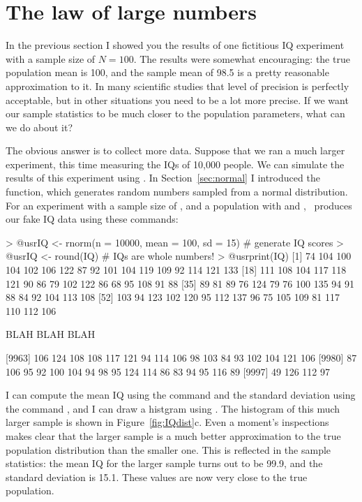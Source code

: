 \section{The law of large numbers~\label{sec:lawlargenumbers}}

In the previous section I showed you the results of one fictitious IQ experiment with a sample size of $N=100$. The results were somewhat encouraging: the true population mean is 100, and the sample mean of 98.5 is a pretty reasonable approximation to it. In many scientific studies that level of precision is perfectly acceptable, but in other situations you need to be a lot more precise. If we want our sample statistics to be much closer to the population parameters, what can we do about it?

The obvious answer is to collect more data. Suppose that we ran a much larger experiment, this time measuring the IQs of 10,000 people. We can simulate the results of this experiment using \R. In Section~\ref{sec:normal} I introduced the  function, which generates random numbers sampled from a normal distribution. For an experiment with a sample size of , and a population with  and , \R\ produces our fake IQ data using these commands:
\begin{rblock1}
> @usr{IQ <- rnorm(n = 10000, mean = 100, sd = 15)} # generate IQ scores
> @usr{IQ <- round(IQ)} # IQs are whole numbers!
> @usr{print(IQ)}
    [1]  74 104 100 104 102 106 122  87  92 101 104 119 109  92 114 121 133
   [18] 111 108 104 117 118 121  90  86  79 102 122  86  68  95 108  91  88
   [35]  89  81  89  76 124  79  76 100 135  94  91  88  84  92 104 113 108
   [52] 103  94 123 102 120  95 112 137  96  75 105 109  81 117 110 112 106
 
BLAH BLAH BLAH

 [9963] 106 124 108 108 117 121  94 114 106  98 103  84  93 102 104 121 106
 [9980]  87 106  95  92 100 104  94  98  95 124 114  86  83  94  95 116  89
 [9997]  49 126 112  97
\end{rblock1}
I can compute the mean IQ using the command  and the standard deviation using the command , and I can draw a histgram using . The histogram of this much larger sample is shown in Figure~\ref{fig:IQdist}c. Even a moment's inspections makes clear that the larger sample is a much better approximation to the true population distribution than the smaller one. This is reflected in the sample statistics: the mean IQ for the larger sample turns out to be 99.9, and the standard deviation is 15.1. These values are now very close to the true population.

